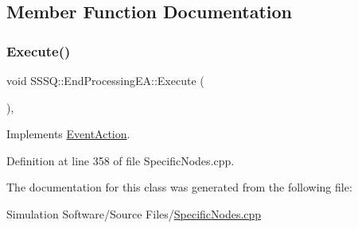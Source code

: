 \subsection{Member Function Documentation}
\mbox{\label{class_s_s_s_q_1_1_end_processing_e_a_a58123dc9ac0660bd1da11407e5467968}} 
\subsubsection{\texorpdfstring{Execute()}{Execute()}}
{\footnotesize\ttfamily void S\+S\+S\+Q\+::\+End\+Processing\+E\+A\+::\+Execute (\begin{DoxyParamCaption}{ }\end{DoxyParamCaption})\hspace{0.3cm}{\ttfamily [inline]}, {\ttfamily [virtual]}}



Implements \hyperlink{class_event_action_a62b9d07abb4ca8e7c078b076a1ab1a9f}{Event\+Action}.



Definition at line 358 of file Specific\+Nodes.\+cpp.



The documentation for this class was generated from the following file\+:\begin{DoxyCompactItemize}
\item 
Simulation Software/\+Source Files/\hyperlink{_specific_nodes_8cpp}{Specific\+Nodes.\+cpp}\end{DoxyCompactItemize}
